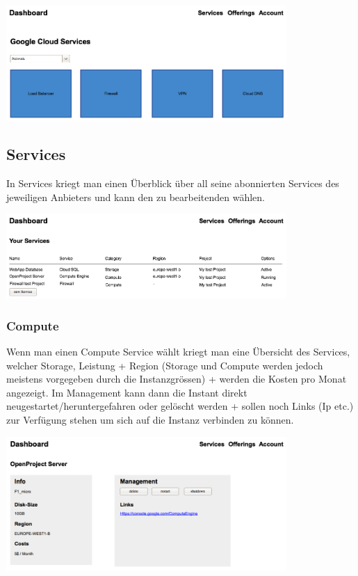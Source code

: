 \documentclass[11pt]{scrartcl}
\begin{document}
  \includegraphics[width=0.8\textwidth]{homescreen_google_network}




\subsection{Services}
In Services kriegt man einen Überblick über all seine abonnierten Services des jeweiligen 
Anbieters und kann den zu bearbeitenden wählen.

\includegraphics[width=0.8\textwidth]{services_overview}


\subsubsection{Compute}
Wenn man einen Compute Service wählt kriegt man eine Übersicht des Services, 
welcher Storage, Leistung + Region (Storage und Compute werden jedoch 
meistens vorgegeben durch die Instanzgrössen) + werden die Kosten pro 
Monat angezeigt.
Im Management kann dann die Instant direkt neugestartet/heruntergefahren oder gelöscht 
werden + sollen noch Links (Ip etc.) zur Verfügung stehen um sich auf die Instanz 
 verbinden zu können.

\includegraphics[width=0.8\textwidth]{service_info_compute}
\end{document}
